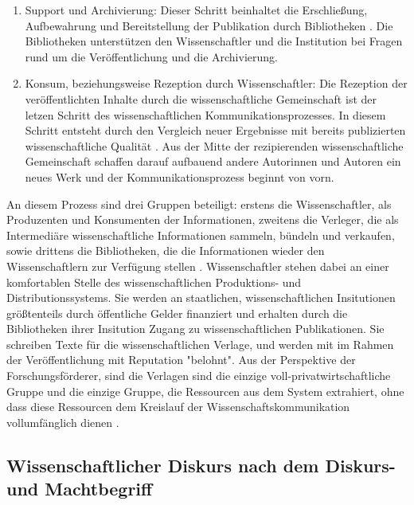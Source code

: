 \begin{enumerate}
\item Support und Archivierung: 
Dieser Schritt beinhaltet die Erschließung, Aufbewahrung und Bereitstellung der Publikation durch Bibliotheken \cite{schirmbacher_2009_wisspub}. Die Bibliotheken unterstützen den Wissenschaftler und die Institution bei Fragen rund um die Veröffentlichung und die Archivierung.
\item Konsum, beziehungsweise Rezeption durch Wissenschaftler: 
Die Rezeption der veröffentlichten Inhalte durch die wissenschaftliche Gemeinschaft \cite{schirmbacher_2009_wisspub} ist der letzen Schritt des wissenschaftlichen Kommunikationsprozesses. In diesem Schritt entsteht durch den Vergleich neuer Ergebnisse mit bereits publizierten wissenschaftliche Qualität \cite{umstatter_2007_qualitatssicherung}. Aus der Mitte der rezipierenden wissenschaftliche Gemeinschaft schaffen darauf aufbauend andere Autorinnen und Autoren ein neues Werk \cite{cite:11k} \cite{schirmbacher_2009_wisspub} und der Kommunikationsprozess beginnt von vorn.
\end{enumerate}

An diesem Prozess sind drei Gruppen beteiligt: erstens die Wissenschaftler, als Produzenten und Konsumenten der Informationen, zweitens die Verleger, die als Intermediäre wissenschaftliche Informationen sammeln, bündeln und verkaufen, sowie drittens die Bibliotheken, die die Informationen wieder den Wissenschaftlern zur Verfügung stellen \cite{Odlyzko_1997}. Wissenschaftler stehen dabei an einer komfortablen Stelle des wissenschaftlichen Produktions- und Distributionssystems\cite{herb_2010}. Sie werden an staatlichen, wissenschaftlichen Insitutionen größtenteils durch öffentliche Gelder finanziert und erhalten durch die Bibliotheken ihrer Insitution Zugang zu wissenschaftlichen Publikationen. Sie schreiben Texte für die wissenschaftlichen Verlage, und werden mit im Rahmen der Veröffentlichung mit Reputation "belohnt". Aus der Perspektive der Forschungsförderer, sind die Verlagen sind die einzige voll-privatwirtschaftliche Gruppe und die einzige Gruppe, die Ressourcen aus dem System extrahiert, ohne dass diese Ressourcen dem Kreislauf der Wissenschaftskommunikation vollumfänglich dienen \cite{kiley_2006_open}.

\subsection{Wissenschaftlicher Diskurs nach dem Diskurs- und Machtbegriff}

